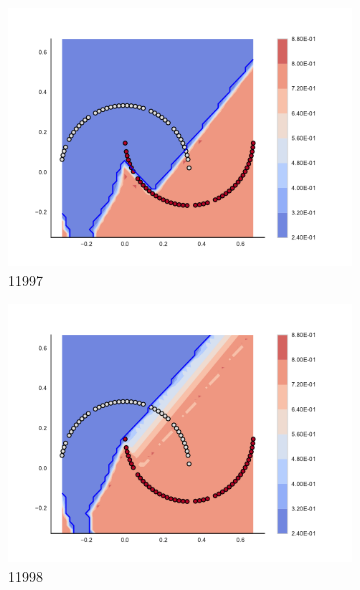 \begin{figure}[h]
\begin{subfigure}[b]{0.09\textwidth}
    \includegraphics[clip, trim=2.35cm 1.75cm 4.5cm 0cm,width=\textwidth]{img/convergence/11997.pdf}
    \caption{11997}
    \label{fig:convergence_11997}
\end{subfigure}
%
\begin{subfigure}[b]{0.09\textwidth}
    \includegraphics[clip, trim=2.35cm 1.75cm 4.5cm 0cm,width=\textwidth]{img/convergence/11998.pdf}
    \caption{11998}
    \label{fig:convergence_11998}
\end{subfigure}
%
\begin{subfigure}[b]{0.09\textwidth}

\end{subfigure}
\end{figure}
